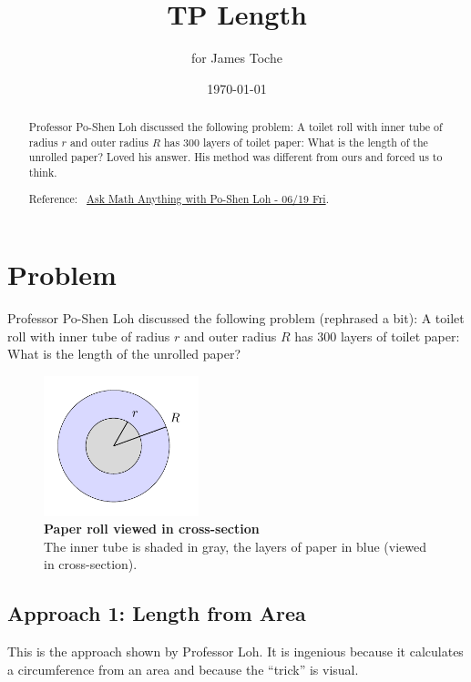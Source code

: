 \documentclass[12pt, a4]{article}
\title{TP Length}
\author{for James Toche}
\date{\today}
\begin{document}
\begin{minipage}{\textwidth}
\maketitle
\begin{abstract}
Professor Po-Shen Loh discussed the following problem: A toilet roll with inner tube of radius $r$ and outer radius $R$ has $300$ layers of toilet paper: What is the length of the unrolled paper? Loved his answer. His method was different from ours and forced us to think. 

Reference:~ 
\href{https://www.youtube.com/watch?v=0iRTzKA1VvA}{Ask Math Anything with Po-Shen Loh - 06/19 Fri}.
\end{abstract}
\end{minipage}

\section*{Problem}
Professor Po-Shen Loh discussed the following problem (rephrased a bit): A toilet roll with inner tube of radius $r$ and outer radius $R$ has $300$ layers of toilet paper: What is the length of the unrolled paper? 


\begin{figure}[hpbt]
\begin{minipage}[b]{\textwidth}
\centering
\includegraphics[width=0.4\textwidth]
{annulus_tikz_1}
\caption{\textbf{Paper roll viewed in cross-section} \\
The inner tube is shaded in gray, the layers of paper in blue (viewed in cross-section). 
\label{fig:annulus:01}}
\end{minipage}
\end{figure}

\newpage
\subsection*{Approach 1: Length from Area}
This is the approach shown by Professor Loh. It is ingenious because it calculates a circumference from an area and because the ``trick'' is visual.
\end{document}
